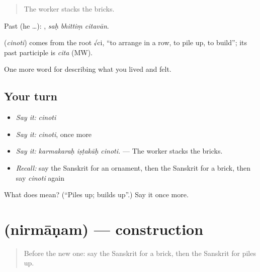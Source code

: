 \begin{quote}
The worker stacks the bricks.
\end{quote}

Past (he …):   , \emph{saḥ bhittiṃ citavān}.

\begin{cousinweb}
\textbf{} (\emph{cinoti}) comes from the root √ci, \textquotedblleft{}to arrange in a row, to pile up, to build\textquotedblright{}; its past participle is \emph{cita} (MW).
\end{cousinweb}

\begin{grammarlens}[title={What you've built}]
One more word for describing what you lived and felt.
\end{grammarlens}

\subsection*{Your turn}
\begin{itemize}
\raggedright
  \item \emph{Say it:} \emph{cinoti}
  \item \emph{Say it:} \emph{cinoti}, once more
  \item \emph{Say it:} \emph{karmakaraḥ iṣṭakāḥ cinoti.} — The worker stacks the bricks.
  \item \emph{Recall:} say the Sanskrit for an ornament, then the Sanskrit for a brick, then say \emph{cinoti} again
\end{itemize}

\begin{tcolorbox}[breakable,colback=teal!4,colframe=teal!35!black,title={Before you move on}]
What does  mean? (\textquotedblleft{}Piles up; builds up\textquotedblright{}.) Say it once more.
\end{tcolorbox}
\section[\texorpdfstring{\sk{निर्माणम्} (nirmāṇam)}{निर्माणम् (nirmāṇam)}]{ (nirmāṇam) — construction}

\label{lesson:SA-C508-nirmanam}



\begin{quote}
Before the new one: say the Sanskrit for a brick, then the Sanskrit for piles up.
\end{quote}

